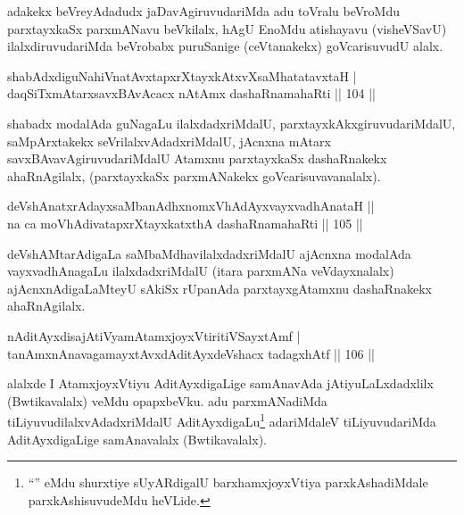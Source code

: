\begin{artha}
adakekx beVreyAdadudx jaDavAgiruvudariMda adu toVralu beVroMdu parxtayxkaSx parxmANavu beVkilalx, hAgU EnoMdu atishayavu (visheVSavU) ilalxdiruvudariMda beVrobabx puruSanige (ceVtanakekx) goVcarisuvudU alalx.
\end{artha}

\begin{shl}
shabAdxdiguNahiVnatAvxtapxrXtayxkAtxvXsaMhatatavxtaH | \\
daqSiTxmAtarxsavxBAvAcacx nA\s \s tAmx dashaRnamahaRti \hfill||  104 ||  
\end{shl}

\begin{artha}
shabadx modalAda guNagaLu ilalxdadxriMdalU, parxtayxkAkxgiruvudariMdalU, saMpArxtakekx seVrilalxvAdadxriMdalU, jAcnxna mAtarx savxBAvavAgiruvudariMdalU Atamxnu parxtayxkaSx dashaRnakekx ahaRnAgilalx, (parxtayxkaSx parxmANakekx goVcarisuvavanalalx).
\end{artha}


\begin{shl}
deVshAnatxrAdayxsaMbanAdhxnomxVhAdAyxvayxvadhAnataH ||  \\
na ca moVhAdivatapxrXtayxkatxthA dashaRnamahaRti \hfill||  105 ||  
\end{shl}

\begin{artha}
deVshAMtarAdigaLa saMbaMdhavilalxdadxriMdalU ajAcnxna modalAda vayxvadhAnagaLu ilalxdadxriMdalU (itara parxmANa veVdayxnalalx) ajAcnxnAdigaLaMteyU sAkiSx rUpanAda parxtayxgAtamxnu dashaRnakekx ahaRnAgilalx.
\end{artha}

\begin{shl}
nA\s \s ditAyxdisajAtiVyamAtamxjoyxVtiritiVSayxtAmf | \\
tanAmxnAnavagamayxtAvxdAditAyxdeVshacx tadagxhAtf \hfill||  106 ||  
\end{shl}

\begin{artha}
alalxde I AtamxjoyxVtiyu AditAyxdigaLige samAnavAda jAtiyuLaLxdadxlilx (Bwtikavalalx) veMdu opapxbeVku. adu parxmANadiMda tiLiyuvudilalxvAdadxriMdalU AditAyxdigaLu\footnote{``\stext'' eMdu shurxtiye sUyARdigalU barxhamxjoyxVtiya parxkAshadiMdale parxkAshisuvudeMdu heVLide.} adariMdaleV tiLiyuvudariMda AditAyxdigaLige samAnavalalx (Bwtikavalalx).
\end{artha}


